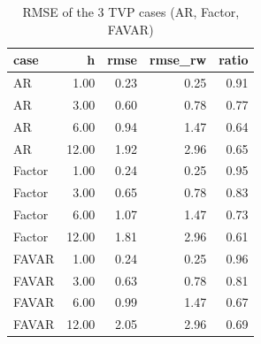 \begin{table}[ht]
\centering
\begin{tabular}{lrrrr}
  \hline
case & h & rmse & rmse\_rw & ratio \\ 
  \hline
AR & 1.00 & 0.23 & 0.25 & 0.91 \\ 
  AR & 3.00 & 0.60 & 0.78 & 0.77 \\ 
  AR & 6.00 & 0.94 & 1.47 & 0.64 \\ 
  AR & 12.00 & 1.92 & 2.96 & 0.65 \\ 
  Factor & 1.00 & 0.24 & 0.25 & 0.95 \\ 
  Factor & 3.00 & 0.65 & 0.78 & 0.83 \\ 
  Factor & 6.00 & 1.07 & 1.47 & 0.73 \\ 
  Factor & 12.00 & 1.81 & 2.96 & 0.61 \\ 
  FAVAR & 1.00 & 0.24 & 0.25 & 0.96 \\ 
  FAVAR & 3.00 & 0.63 & 0.78 & 0.81 \\ 
  FAVAR & 6.00 & 0.99 & 1.47 & 0.67 \\ 
  FAVAR & 12.00 & 2.05 & 2.96 & 0.69 \\ 
   \hline
\end{tabular}
\caption{RMSE of the 3 TVP cases (AR, Factor, FAVAR)} 
\label{tab:tvp_3cases}
\end{table}
